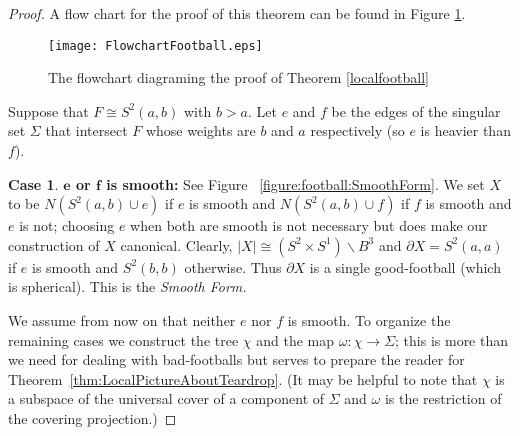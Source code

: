 \documentclass[12pt,reqno]{amsart}
\theoremstyle{plain}
\theoremstyle{definition}
\newtheorem{case}{Case}
\numberwithin{subcase}{case}
\theoremstyle{plain}
\theoremstyle{definition}
\def\scl[#1][#2]{{\scalebox{#1}{#2}}}
\def\vp{v_{+}}
\def\vm{v_{-}}
\begin{document}
\begin{proof}
\setcounter{case}{0}
A flow chart for the proof of this theorem can be found in Figure \ref{FlowchartForFootballs}. 
\begin{figure}[h!]
\psfrag{1}{\scl[.7][Yes]}
\psfrag{2}{\scl[.7][No]}
\psfrag{a}{\scl[.7][Input]}
\psfrag{b}{\scl[.7][Bad-Football]}
\psfrag{c}{\scl[.7][Is $e$ or $f$]}
\psfrag{j}{\scl[.7][smooth?]}
\psfrag{e}{\scl[.7][Smooth]}
\psfrag{f}{\scl[.7][Form]}
\psfrag{g}{\scl[.7][Form 1]}
\psfrag{h}{\scl[.7][Form 2]}
\psfrag{i}{\scl[.7][\(\vp \stackrel{?}{=} \vm\)]}
\centerline{\texttt{[image: FlowchartFootball.eps]}}
\caption{The flowchart diagraming the proof of Theorem \ref{localfootball}}
\label{FlowchartForFootballs}
\end{figure}
Suppose that \(F \cong S^{2}(a,b)\) with \(b>a\).
Let \(e\) and \(f\) be the edges of the singular set \(\Sigma\) that intersect \(F\) whose weights are \(b\) and \(a\) respectively (so \(e\) is heavier than \(f\)).

\begin{case}
\textbf{$\boldsymbol{e}$ or $\boldsymbol{f}$ is smooth:}
See Figure ~\ref{figure:football:SmoothForm}.
We set \(X\) to be \(N\left(S^{2}(a,b) \cup e\right)\) if \(e\) is smooth and  \(N\left(S^{2}(a,b) \cup f\right)\) if \(f\) is smooth and \(e\) is not; choosing \(e\) when both are smooth is not necessary but does make our construction of \(X\) canonical.  Clearly, $|X| \cong \left(S^2\times S^1\right)\backslash B^3$ and $\partial X=S^2(a,a)$ if $e$ is smooth and $S^2(b,b)$ otherwise.  Thus \(\partial X\) is a single good-football (which is spherical).  This is the \em Smooth Form.\em
\end{case}

\bigskip\noindent
We assume from now on that neither \(e\) nor \(f\) is smooth.  To organize the remaining cases we construct the tree \(\chi\) and the map \(\omega:\chi \to \Sigma\); this is more than we need for dealing with bad-footballs but serves to prepare the reader for Theorem~\ref{thm:LocalPictureAboutTeardrop}.  (It may be helpful to note that \(\chi\) is a subspace of the universal cover of a component of \(\Sigma\) and \(\omega\) is the restriction of the covering projection.)


\end{proof}
\end{document}
